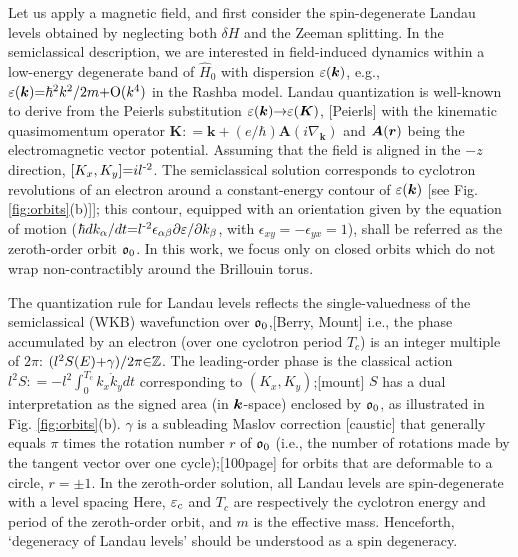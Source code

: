 \documentclass[aps, prb, showpacs, twocolumn, notitlepage, superscriptaddress]{revtex4-1}
\begin{document}
Let us apply a magnetic field, and first consider the spin-degenerate Landau levels obtained by neglecting both $\delta H$ and the Zeeman splitting. In the  semiclassical description,  we are interested in  field-induced dynamics within a low-energy degenerate band of $\hat{H}_0$ with  dispersion $\varepsilon(\boldsymbol{k})$, e.g., $\varepsilon(\boldsymbol{k}){=}\hbar^2 k^2/2m{+}\text{O}(k^4)$ in the Rashba model.    Landau quantization is well-known to derive from the Peierls substitution $\varepsilon(\boldsymbol{k}){\rightarrow}\varepsilon(\boldsymbol{K})$, [Peierls] with the kinematic quasimomentum operator   $\boldsymbol{K}{:}{=}\boldsymbol{k}{+}(e/\hbar) \boldsymbol{A}(i\nabla_{\boldsymbol{k}})$ and $\boldsymbol{A}(\boldsymbol{r})$ being the electromagnetic vector potential. Assuming that the field is aligned in the ${-}z$ direction, $[K_x,K_y]{=}il^{\text{-}2}$. The semiclassical solution corresponds to  cyclotron revolutions of an electron around a constant-energy contour of $\varepsilon(\boldsymbol{k})$ [see Fig. \ref{fig:orbits}(b)]]; this contour, equipped with an orientation given by the equation of motion ($ \hbar dk_{\alpha}/dt {=} l^{\text{-}2} \epsilon_{\alpha\beta}\partial \varepsilon/\partial k_{\beta} $, with $\epsilon_{xy}{=}{-}\epsilon_{yx}{=}1$), shall be referred as the zeroth-order orbit $\mathfrak{o}_0$.  In this work, we focus only on closed orbits which do not wrap 
non-contractibly around the Brillouin torus.



The quantization rule for Landau levels reflects the single-valuedness of the semiclassical (WKB) wavefunction over $\mathfrak{o}_0$,[Berry, Mount] i.e.,  the phase accumulated by an electron (over one cyclotron period $T_c$) is an integer multiple of $2\pi$: $(l^2S(E){+}\gamma)/2\pi{\in}\mathbb{Z}$. The leading-order phase   is the classical action $l^2S{:}{=}{-}l^2\int_{0}^{T_c} k_x \dot{k}_y dt$  corresponding to $(K_x,K_y)$;[mount] $S$ has a dual interpretation as the signed area (in $\boldsymbol{k}$-space) enclosed by $\mathfrak{o}_0$, as illustrated in Fig. \ref{fig:orbits}(b). $\gamma$ is a subleading Maslov correction [caustic] that generally equals $\pi$ times the rotation number $r$ of $\mathfrak{o}_0$ (i.e., the number of rotations made by the tangent vector over one cycle);[100page] for orbits that are deformable to a circle,  $r{=}{\pm} 1$. In the zeroth-order  solution, all Landau levels are spin-degenerate with a level spacing 
Here, $\varepsilon_c$ and $T_c$ are respectively the cyclotron energy and period of the zeroth-order orbit, and $m$ is the effective mass. Henceforth, `degeneracy of Landau levels' should be understood as a spin degeneracy. 
\end{document}

